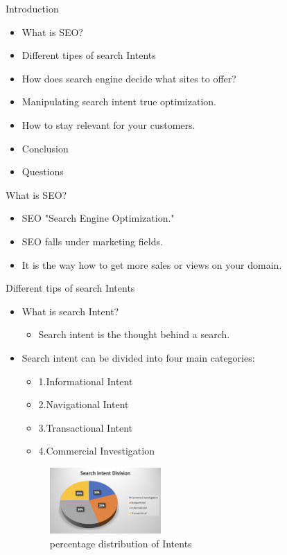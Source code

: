 \documentclass[aspectratio=169]{beamer}
\begin{document}
{{\begin{frame} {\huge Introduction}
\begin{itemize}
    \item<1-> What is SEO?
    \pause
    \item<2-> Different tipes of search Intents
    \pause
    \item<3-> How does search engine decide what sites to offer?
    \pause
    \item<4-> Manipulating search intent true optimization.
    \pause
    \item<5-> How to stay relevant for your customers.
    \pause
    \item<6-> Conclusion
    \pause
    \item<7-> Questions
\end{itemize}

\end{frame}

\begin{frame} {\huge What is SEO?}

\begin{itemize}
    \item<1-> SEO "Search Engine Optimization."
    \pause
    \item<2-> SEO falls under marketing fields.
    \pause
    \item<3-> It is the way how to get more sales or views on your domain.
    \pause
    
\end{itemize}
\end{frame}

\begin{frame} {\huge Different tips of search Intents}
\begin{itemize}
    \item<1-> What is search Intent?
    \pause
    \begin{itemize}
        \item<2-> Search intent is the thought behind a search.
        \pause
    \end{itemize}
    \item<3-> Search intent can be divided into four main categories:
    \pause
    \begin{itemize}
	\item<4-> 1.Informational Intent
 \pause
    \item<5-> 2.Navigational Intent
    \pause
    \item<6-> 3.Transactional Intent
    \pause
    \item<7-> 4.Commercial Investigation 
    \pause
 \end{itemize}
    \begin{figure}[]
        \includegraphics[width=0.4\textwidth]{pics/Pie graph 2.png} \caption{percentage distribution of Intents \cite{Picture1}} 
    \end{figure}
    

\end{itemize}
\end{frame}}}
\end{document}
